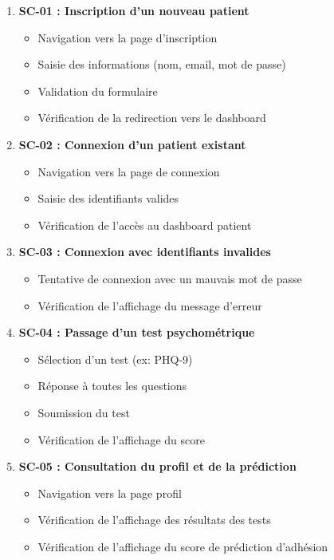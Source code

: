 \documentclass[12pt,a4paper]{report}
\begin{document}
\begin{enumerate}
    \item \textbf{SC-01 : Inscription d'un nouveau patient}
    \begin{itemize}
        \item Navigation vers la page d'inscription
        \item Saisie des informations (nom, email, mot de passe)
        \item Validation du formulaire
        \item Vérification de la redirection vers le dashboard
    \end{itemize}
    
    \item \textbf{SC-02 : Connexion d'un patient existant}
    \begin{itemize}
        \item Navigation vers la page de connexion
        \item Saisie des identifiants valides
        \item Vérification de l'accès au dashboard patient
    \end{itemize}
    
    \item \textbf{SC-03 : Connexion avec identifiants invalides}
    \begin{itemize}
        \item Tentative de connexion avec un mauvais mot de passe
        \item Vérification de l'affichage du message d'erreur
    \end{itemize}
    
    \item \textbf{SC-04 : Passage d'un test psychométrique}
    \begin{itemize}
        \item Sélection d'un test (ex: PHQ-9)
        \item Réponse à toutes les questions
        \item Soumission du test
        \item Vérification de l'affichage du score
    \end{itemize}
    
    \item \textbf{SC-05 : Consultation du profil et de la prédiction}
    \begin{itemize}
        \item Navigation vers la page profil
        \item Vérification de l'affichage des résultats des tests
        \item Vérification de l'affichage du score de prédiction d'adhésion
    \end{itemize}
    

\end{enumerate}
\end{document}
